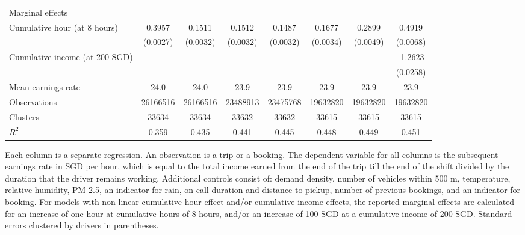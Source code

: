 \documentclass[reviewmode]{restat}
\begin{document}
\begin{table}
\begin{tabularx}{\textwidth}{l@{\extracolsep{\fill}}*{7}{S}}
        \midrule
        Marginal effects & & & & & &\\
        \quad Cumulative hour (at 8 hours)&      0.3957&      0.1511&      0.1512&      0.1487&      0.1677&      0.2899&      0.4919\\
                    &    (0.0027)&    (0.0032)&    (0.0032)&    (0.0032)&    (0.0034)&    (0.0049)&    (0.0068)\\
        \addlinespace
        \quad Cumulative income (at 200 SGD)&            &            &            &            &            &            &     -1.2623\\
                    &            &            &            &            &            &            &    (0.0258)\\
        \addlinespace
        Mean earnings rate&        24.0&        24.0&        23.9&        23.9&        23.9&        23.9&        23.9\\
        Observations&\num{26166516}&\num{26166516}&\num{23488913}&\num{23475768}&\num{19632820}&\num{19632820}&\num{19632820}\\
        Clusters    & \num{33634}& \num{33634}& \num{33632}& \num{33632}& \num{33615}& \num{33615}& \num{33615}\\
        \(R^2\)     &       0.359&       0.435&       0.441&       0.445&       0.448&       0.449&       0.451\\
        \bottomrule
    \end{tabularx}

	\begin{tablenotes}
    Each column is a separate regression. An observation is a trip or a booking. The dependent variable for all columns is the subsequent earnings rate in SGD per hour, which is equal to the total income earned from the end of the trip till the end of the shift divided by the duration that the driver remains working. Additional controls consist of: demand density, number of vehicles within 500 m, temperature, relative humidity, PM 2.5, an indicator for rain, on-call duration and distance to pickup, number of previous bookings, and an indicator for booking. For models with non-linear cumulative hour effect and/or cumulative income effects, the reported marginal effects are calculated for an increase of one hour at cumulative hours of 8 hours, and/or an increase of 100 SGD at a cumulative income of 200 SGD.  Standard errors clustered by drivers in parentheses. 
	\end{tablenotes}
\end{table}
\end{document}
